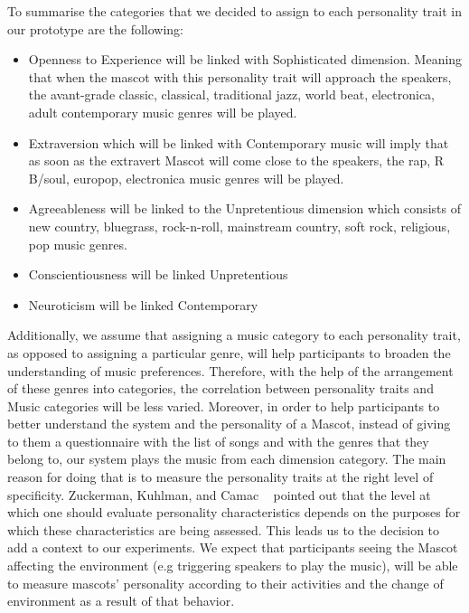 \par To summarise the categories that we decided to assign to each personality trait in our prototype are the following:
\begin{itemize}
\item Openness to Experience will be linked with Sophisticated dimension. Meaning that when the mascot with this personality trait will approach the speakers, the avant-grade classic, classical, traditional jazz, world beat, electronica, adult contemporary music genres will be played.
\item Extraversion which will be linked with Contemporary music will imply that as soon as the extravert Mascot will come close to the speakers, the rap, R B/soul, europop, electronica music genres will be played.
\item Agreeableness will be linked to the Unpretentious dimension which consists of new country, bluegrass, rock-n-roll, mainstream country, soft rock, religious, pop music genres.
\item Conscientiousness will be linked Unpretentious
\item Neuroticism will be linked Contemporary
\end{itemize}

\par Additionally, we assume that assigning a music category to each personality trait, as opposed to assigning a particular genre, will help participants to broaden the understanding of music preferences. Therefore, with the help of the arrangement of these genres into categories, the correlation between personality traits and Music categories will be less varied. Moreover, in order to help participants to better understand the system and the personality of a Mascot, instead of giving to them a questionnaire with the list of songs and with the genres that they belong to, our system plays the music from each dimension category. The main reason for doing that is to measure the personality traits at the right level of specificity. Zuckerman, Kuhlman, and Camac ~\cite{zuckerman1988lies} pointed out that the level at which one should evaluate personality characteristics depends on the purposes for which these characteristics are being assessed. This leads us to the decision to add a context to our experiments. We expect that participants seeing the Mascot affecting the environment (e.g triggering speakers to play the music), will be able to measure mascots' personality according to their activities and the change of environment as a result of that behavior.


